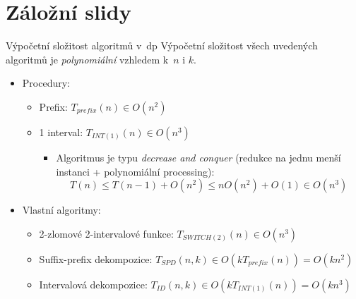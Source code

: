 \documentclass{beamer}
\theoremstyle{remark}
\begin{document}
\appendix

\section{Záložní slidy}

\frame{\sectionpage}

\begin{frame}{Výpočetní složitost algoritmů v~\acrshort{dp}}
Výpočetní složitost všech uvedených algoritmů je \emph{polynomiální} vzhledem k~$n$ i $k$.

\begin{itemize}
\item Procedury:
\begin{itemize}
\item Prefix: $T_{prefix}(n) \in O(n^2)$
\item 1 interval: $T_{INT(1)}(n) \in O(n^3)$
\begin{itemize}
\item
Algoritmus je typu \emph{decrease and conquer} (redukce na jednu menší instanci + polynomiální processing):
$$T(n) \leq T(n-1) + O(n^2) \leq n O(n^2) + O(1) \in O(n^{3})$$
\end{itemize}
\end{itemize}
\item Vlastní algoritmy:
\begin{itemize}
\item 2-zlomové 2-intervalové funkce: $T_{SWITCH(2)}(n) \in O(n^3)$
\item Suffix-prefix dekompozice: $T_{SPD}(n, k) \in O(k T_{prefix}(n)) = O(kn^2)$
\item Intervalová dekompozice: $T_{ID}(n, k) \in O(k T_{INT(1)}(n)) = O(k n^3)$
\end{itemize}
\end{itemize}

\end{frame}

\end{document}
